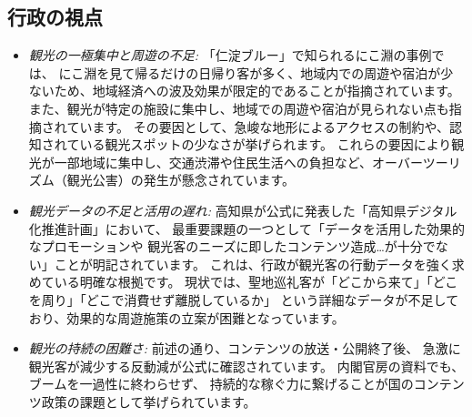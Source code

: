 \documentclass{docs}
\begin{document}
\subsection{行政の視点}
\begin{itemize}
\item \emph{観光の一極集中と周遊の不足:}
  「仁淀ブルー」で知られるにこ淵の事例\cite{nikobuchi_mlit}では、
  にこ淵を見て帰るだけの日帰り客が多く、地域内での周遊や宿泊が少ないため、地域経済への波及効果が限定的であることが指摘されています。
	また、観光が特定の施設に集中し、地域での周遊や宿泊が見られない点も指摘されています。
  その要因として、急峻な地形によるアクセスの制約や、認知されている観光スポットの少なさが挙げられます。
  これらの要因により観光が一部地域に集中し、交通渋滞や住民生活への負担など、オーバーツーリズム（観光公害）\cite{kanko_overtourism}の発生が懸念されています。

	\item \emph{観光データの不足と活用の遅れ:}
	高知県が公式に発表した「高知県デジタル化推進計画」\cite{kochi_dx_plan}において、
	最重要課題の一つとして「データを活用した効果的なプロモーションや
	観光客のニーズに即したコンテンツ造成…が十分でない」ことが明記されています。
	これは、行政が観光客の行動データを強く求めている明確な根拠です。
	現状では、聖地巡礼客が「どこから来て」「どこを周り」「どこで消費せず離脱しているか」
	という詳細なデータが不足しており、効果的な周遊施策の立案が困難となっています。

	\item \emph{観光の持続の困難さ:}
	前述の通り、コンテンツの放送・公開終了後、
	急激に観光客が減少する反動減が公式に確認されています\cite{kochi_r7_plan}。
	内閣官房の資料\cite{cas_kadokawa}でも、ブームを一過性に終わらせず、
	持続的な稼ぐ力に繋げることが国のコンテンツ政策の課題として挙げられています。
\end{itemize}
\end{document}
